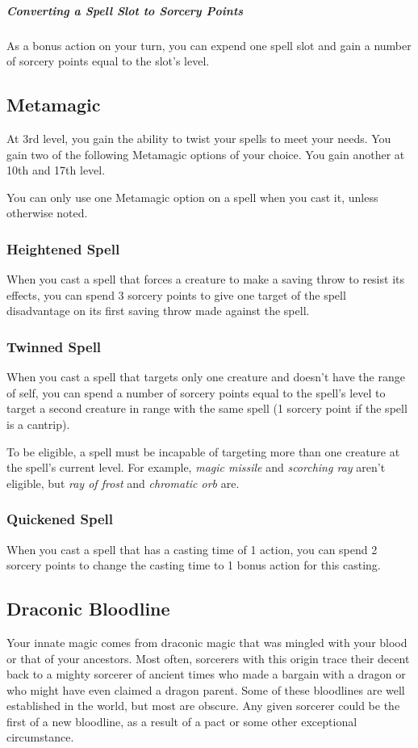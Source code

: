 \documentclass[a4paper,openany,twocolumn]{book}
\begin{document}
\subparagraph*{Converting a Spell Slot to Sorcery Points} As a bonus action on your turn, you can expend one spell slot and gain a number of sorcery points equal to the slot's level.

\subsection*{Metamagic}
At 3rd level, you gain the ability to twist your spells to meet your needs. You gain two of the following Metamagic options of your choice. You gain another at 10th and 17th level.

You can only use one Metamagic option on a spell when you cast it, unless otherwise noted.

\subsubsection*{Heightened Spell}
When you cast a spell that forces a creature to make a saving throw to resist its effects, you can spend 3 sorcery points to give one target of the spell disadvantage on its first saving throw made against the spell.

\subsubsection*{Twinned Spell}
When you cast a spell that targets only one creature and doesn't have the range of self, you can spend a number of sorcery points equal to the spell's level to target a second creature in range with the same spell (1 sorcery point if the spell is a cantrip).

To be eligible, a spell must be incapable of targeting more than one creature at the spell's current level. For example, \textit{magic missile} and \textit{scorching ray} aren't eligible, but \textit{ray of frost} and \textit{chromatic orb} are.

\subsubsection*{Quickened Spell}
When you cast a spell that has a casting time of 1 action, you can spend 2 sorcery points to change the casting time to 1 bonus action for this casting.

\subsection*{Draconic Bloodline}
Your innate magic comes from draconic magic that was mingled with your blood or that of your ancestors. Most often, sorcerers with this origin trace their decent back to a mighty sorcerer of ancient times who made a bargain with a dragon or who might have even claimed a dragon parent. Some of these bloodlines are well established in the world, but most are obscure. Any given sorcerer could be the first of a new bloodline, as a result of a pact or some other exceptional circumstance.
\end{document}
